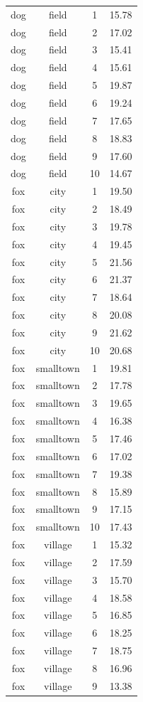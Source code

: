 \documentclass[
  letterpaper,
]{scrbook}
\begin{document}
\begin{longtable}[]{@{}cccc@{}}
dog & field & 1 & 15.78 \\
dog & field & 2 & 17.02 \\
dog & field & 3 & 15.41 \\
dog & field & 4 & 15.61 \\
dog & field & 5 & 19.87 \\
dog & field & 6 & 19.24 \\
dog & field & 7 & 17.65 \\
dog & field & 8 & 18.83 \\
dog & field & 9 & 17.60 \\
dog & field & 10 & 14.67 \\
fox & city & 1 & 19.50 \\
fox & city & 2 & 18.49 \\
fox & city & 3 & 19.78 \\
fox & city & 4 & 19.45 \\
fox & city & 5 & 21.56 \\
fox & city & 6 & 21.37 \\
fox & city & 7 & 18.64 \\
fox & city & 8 & 20.08 \\
fox & city & 9 & 21.62 \\
fox & city & 10 & 20.68 \\
fox & smalltown & 1 & 19.81 \\
fox & smalltown & 2 & 17.78 \\
fox & smalltown & 3 & 19.65 \\
fox & smalltown & 4 & 16.38 \\
fox & smalltown & 5 & 17.46 \\
fox & smalltown & 6 & 17.02 \\
fox & smalltown & 7 & 19.38 \\
fox & smalltown & 8 & 15.89 \\
fox & smalltown & 9 & 17.15 \\
fox & smalltown & 10 & 17.43 \\
fox & village & 1 & 15.32 \\
fox & village & 2 & 17.59 \\
fox & village & 3 & 15.70 \\
fox & village & 4 & 18.58 \\
fox & village & 5 & 16.85 \\
fox & village & 6 & 18.25 \\
fox & village & 7 & 18.75 \\
fox & village & 8 & 16.96 \\
fox & village & 9 & 13.38 \\

\end{longtable}
\end{document}
